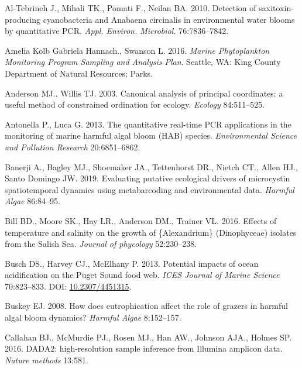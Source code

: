 \documentclass[
]{article}
\begin{document}
\leavevmode\hypertarget{ref-al2010detection}{}%
Al-Tebrineh J., Mihali TK., Pomati F., Neilan BA. 2010. Detection of
saxitoxin-producing cyanobacteria and Anabaena circinalis in
environmental water blooms by quantitative PCR. \emph{Appl. Environ.
Microbiol.} 76:7836--7842.

\leavevmode\hypertarget{ref-king}{}%
Amelia Kolb Gabriela Hannach., Swanson L. 2016. \emph{Marine
Phytoplankton Monitoring Program Sampling and Analysis Plan}. Seattle,
WA: King County Department of Natural Resources; Parks.

\leavevmode\hypertarget{ref-anderson2003canonical}{}%
Anderson MJ., Willis TJ. 2003. Canonical analysis of principal
coordinates: a useful method of constrained ordination for ecology.
\emph{Ecology} 84:511--525.

\leavevmode\hypertarget{ref-antonella2013quantitative}{}%
Antonella P., Luca G. 2013. The quantitative real-time PCR applications
in the monitoring of marine harmful algal bloom (HAB) species.
\emph{Environmental Science and Pollution Research} 20:6851--6862.

\leavevmode\hypertarget{ref-banerji2019evaluating}{}%
Banerji A., Bagley MJ., Shoemaker JA., Tettenhorst DR., Nietch CT.,
Allen HJ., Santo Domingo JW. 2019. Evaluating putative ecological
drivers of microcystin spatiotemporal dynamics using metabarcoding and
environmental data. \emph{Harmful Algae} 86:84--95.

\leavevmode\hypertarget{ref-bill2016effects}{}%
Bill BD., Moore SK., Hay LR., Anderson DM., Trainer VL. 2016. Effects of
temperature and salinity on the growth of \{Alexandrium\} (Dinophyceae)
isolates from the Salish Sea. \emph{Journal of phycology} 52:230--238.

\leavevmode\hypertarget{ref-busch2013potential}{}%
Busch DS., Harvey CJ., McElhany P. 2013. Potential impacts of ocean
acidification on the Puget Sound food web. \emph{ICES Journal of Marine
Science} 70:823--833. DOI:
\href{https://doi.org/10.2307/4451315}{10.2307/4451315}.

\leavevmode\hypertarget{ref-buskey2008does}{}%
Buskey EJ. 2008. How does eutrophication affect the role of grazers in
harmful algal bloom dynamics? \emph{Harmful Algae} 8:152--157.

\leavevmode\hypertarget{ref-callahan2016dada2}{}%
Callahan BJ., McMurdie PJ., Rosen MJ., Han AW., Johnson AJA., Holmes SP.
2016. DADA2: high-resolution sample inference from Illumina amplicon
data. \emph{Nature methods} 13:581.
\end{document}
